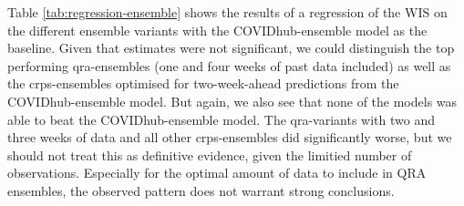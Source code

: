 \documentclass[
]{book}
\begin{document}
Table \ref{tab:regression-ensemble} shows the results of a regression of the WIS on the different ensemble variants with the COVIDhub-ensemble model as the baseline. Given that estimates were not significant, we could distinguish the top performing qra-ensembles (one and four weeks of past data included) as well as the crps-ensembles optimised for two-week-ahead predictions from the COVIDhub-ensemble model. But again, we also see that none of the models was able to beat the COVIDhub-ensemble model. The qra-variants with two and three weeks of data and all other crps-ensembles did significantly worse, but we should not treat this as definitive evidence, given the limitied number of observations. Especially for the optimal amount of data to include in QRA ensembles, the observed pattern does not warrant strong conclusions.
\end{document}
